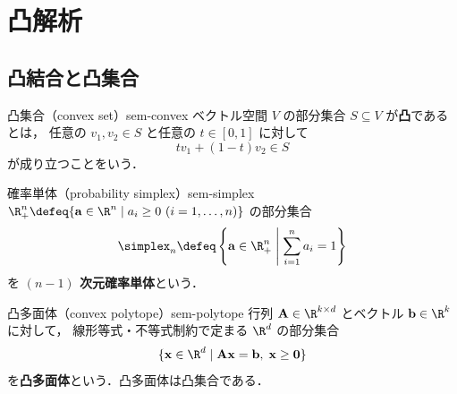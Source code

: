 \section{凸解析}
\label{sec:sem-convex-analysis}

\subsection{凸結合と凸集合}
\label{sec:sem-convex}

\begin{definition}{凸集合（convex set）}{sem-convex}
  ベクトル空間 $V$ の部分集合 $S \subseteq V$ が\textbf{凸}であるとは，
  任意の $v_1, v_2 \in S$ と任意の $t \in [0,1]$ に対して
  \[
    t v_1 + (1-t) v_2 \in S
  \]
  が成り立つことをいう．
\end{definition}

\begin{definition}{確率単体（probability simplex）}{sem-simplex}
  $\R_+^n \defeq \{\mathbf{a} \in \R^n \mid a_i \geq 0\ (i=1,\ldots,n)\}$ の部分集合
  \[
    \simplex_n \defeq \left\{
      \mathbf{a} \in \R_+^n \;\middle|\; \sum_{i=1}^{n} a_i = 1
    \right\}
  \]
  を \textbf{$(n-1)$ 次元確率単体}という．
\end{definition}

\begin{definition}{凸多面体（convex polytope）}{sem-polytope}
  行列 $\mathbf{A} \in \R^{k \times d}$ とベクトル $\mathbf{b} \in \R^k$ に対して，
  線形等式・不等式制約で定まる $\R^d$ の部分集合
  \[
    \{\mathbf{x} \in \R^d \mid
      \mathbf{A}\mathbf{x} = \mathbf{b},\; \mathbf{x} \geq \mathbf{0}\}
  \]
  を\textbf{凸多面体}という．凸多面体は凸集合である．
\end{definition}
